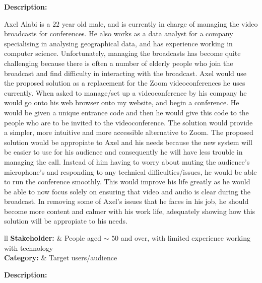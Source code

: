 \textbf{Description:} \\ \vspace{0.05cm}

Axel Alabi is a $22$ year old male, and is currently in charge 
of managing the video broadcasts for conferences. He also
works as a data analyst for a company specialising in analysing
geographical data, and has experience working in computer 
science. Unfortunately, managing the broadcasts has become 
quite challenging because there is often a number of elderly
people who join the broadcast and find difficulty in
interacting with the broadcast. Axel would use the proposed 
solution as a replacement for the Zoom videoconferences he uses
currently. When asked to manage/set up a videoconference by 
his company he would go onto his web browser onto my website,
and begin a conference. He would be given a unique entrance
code and then he would give this code to the people who are to 
be invited to the videoconference. The solution would provide a
simpler, more intuitive and more accessible alternative to
Zoom. The proposed solution would be appropiate to Axel and his
needs because the new system will be easier to use for his 
audience and consequently he will have less trouble in managing
the call. Instead of him having to worry about muting the 
audience's microphone's and responding to any technical
difficulties/issues, he would be able to run the conference 
smoothly. This would improve his life greatly as he would be 
able to now focus solely on ensuring that video and audio is 
clear during the broadcast. In removing some of Axel's issues
that he faces in his job, he should become more content and 
calmer with his work life, adequately showing how this solution
will be appropiate to his needs.

\vspace{0.2cm}

\noindent
\begin{tblr}{ll}
  \textbf{Stakeholder: } & {People aged $\sim$ 
  \hspace{-0.2cm} $50$ and over, with limited experience
  working with technology}\\
  \textbf{Category: } & Target users/audience\\
\end{tblr}
\vspace{0.2cm}

\textbf{Description: } \\ \vspace{0.05cm}

